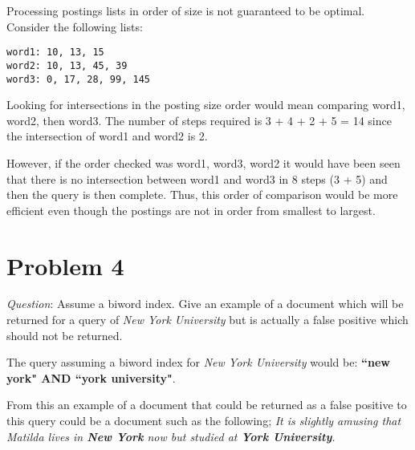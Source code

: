 \documentclass{article}
\begin{document}
Processing postings lists in order of size is not guaranteed to be optimal. Consider the following lists: 

\begin{verbatim}
word1: 10, 13, 15
word2: 10, 13, 45, 39
word3: 0, 17, 28, 99, 145
\end{verbatim}

Looking for intersections in the posting size order would mean comparing word1, word2, then word3. The number of steps required is 3 + 4 + 2 + 5 = 14 since the intersection of word1 and word2 is 2. 

However, if the order checked was word1, word3, word2 it would have been seen that there is no intersection between word1 and word3 in 8 steps (3 + 5) and then the query is then complete. Thus, this order of comparison would be more efficient even though the postings are not in order from smallest to largest. 


\section{Problem 4}
\textit{Question}: Assume a biword index. Give an example of a document which will be returned for a query of \textit{New York University} but is actually a false positive which should not be returned.

The query assuming a biword index for \textit{New York University} would be: 
\textbf{``new york" AND ``york university"}.

From this an example of a document that could be returned as a false positive to this query could be a document such as the following; \textit{It is slightly amusing that Matilda lives in \textbf{New York} now but studied at \textbf{York University}.}
\end{document}
